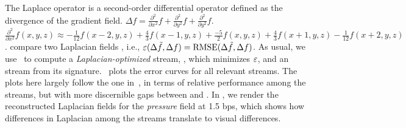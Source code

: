 The Laplace operator is a second-order differential operator defined as the divergence of the
gradient field. 
 $\Delta
f=\frac{{\partial}^2}{\partial{x^2}}f+\frac{{\partial}^2}{\partial{y^2}}f+\frac{{\partial}^2}{\partial{y^2}}f$. 
 $\frac{{\partial}^2}{\partial{x^2}}f(x,y,z) \approx
-\frac{1}{12}f(x-2,y,z)+\frac{4}{3}f(x-1,y,z)+\frac{-5}{2}f(x,y,z)+\frac{4}{3}f(x+1,y,z)-\frac{1}{12}f(x+2,y,z)$.
 compare two Laplacian fields , i.e., $\err(\Delta \tilde{f},\Delta
f)=\text{RMSE}(\Delta \tilde{f},\Delta f)$.  As usual, we use~ to compute a
\emph{Laplacian-optimized} stream, \slop, which minimizes $\err$, and an \slsg stream from its
signature.~ plots the error curves for all relevant streams.
The plots here largely follow the one in~, in terms of relative
performance among the streams, but with more discernible gaps between \sbit and \slsg. In
, we render the reconstructed Laplacian fields for the
\emph{pressure} field at 1.5 bps, which shows how differences in Laplacian among the streams
translate to visual differences.
